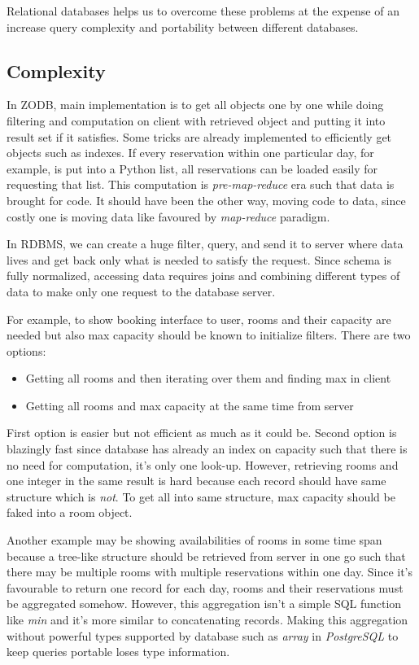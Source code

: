 Relational databases helps us to overcome these problems at the expense of an increase query complexity and portability between different databases.

\subsection{Complexity}

In ZODB, main implementation is to get all objects one by one while doing filtering and computation on client with retrieved object and putting it into result set if it satisfies. Some tricks are already implemented to efficiently get objects such as indexes. If every reservation within one particular day, for example, is put into a Python list, all reservations can be loaded easily for requesting that list. This computation is \textit{pre-map-reduce} era such that data is brought for code. It should have been the other way, moving code to data, since costly one is moving data like favoured by \textit{map-reduce} paradigm.

In RDBMS, we can create a huge filter, query, and send it to server where data lives and get back only what is needed to satisfy the request. Since schema is fully normalized, accessing data requires joins and combining different types of data to make only one request to the database server.

For example, to show booking interface to user, rooms and their capacity are needed but also max capacity should be known to initialize filters. There are two options:
\begin{itemize}
  \item Getting all rooms and then iterating over them and finding max in client
  \item Getting all rooms and max capacity at the same time from server
\end{itemize}

First option is easier but not efficient as much as it could be. Second option is blazingly fast since database has already an index on capacity such that there is no need for computation, it's only one look-up. However, retrieving rooms and one integer in the same result is hard because each record should have same structure which is \textit{not}. To get all into same structure, max capacity should be faked into a room object. 

Another example may be showing availabilities of rooms in some time span because a tree-like structure should be retrieved from server in one go such that there may be multiple rooms with multiple reservations within one day. Since it's favourable to return one record for each day, rooms and their reservations must be aggregated somehow. However, this aggregation isn't a simple SQL function like \textit{min} and it's more similar to concatenating records. Making this aggregation without powerful types supported by database such as \textit{array} in \textit{PostgreSQL} to keep queries portable loses type information.

